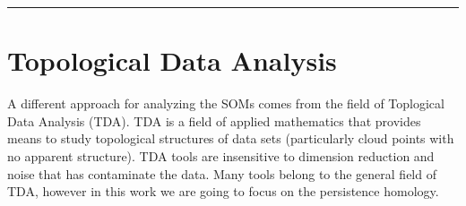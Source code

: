 \documentclass[10pt]{article}
\theoremstyle{definition}
\begin{document}

\noindent \rule{\textwidth}{1pt}

\section{Topological Data Analysis}

A different approach for analyzing the SOMs comes from the field of Toplogical
Data Analysis (TDA). TDA is a field of applied mathematics that provides 
means to study topological structures of data sets (particularly cloud points
with no apparent structure). TDA tools are insensitive to dimension reduction
and noise that has contaminate the data. 
Many tools belong to the general field of TDA, however in this work we are
going to focus on the persistence homology. 
\end{document}

